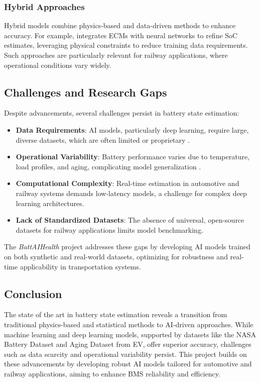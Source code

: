 \subsubsection{Hybrid Approaches}
Hybrid models combine physics-based and data-driven methods to enhance accuracy. For example, \cite{} integrates ECMs with neural networks to refine SoC estimates, leveraging physical constraints to reduce training data requirements. Such approaches are particularly relevant for railway applications, where operational conditions vary widely.


\subsection{Challenges and Research Gaps}
Despite advancements, several challenges persist in battery state estimation:
\begin{itemize}
    \item \textbf{Data Requirements}: AI models, particularly deep learning, require large, diverse datasets, which are often limited or proprietary .
    \item \textbf{Operational Variability}: Battery performance varies due to temperature, load profiles, and aging, complicating model generalization .
    \item \textbf{Computational Complexity}: Real-time estimation in automotive and railway systems demands low-latency models, a challenge for complex deep learning architectures.
    \item \textbf{Lack of Standardized Datasets}: The absence of universal, open-source datasets for railway applications limits model benchmarking.
\end{itemize}
The \textit{BattAIHealth} project addresses these gaps by developing AI models trained on both synthetic and real-world datasets, optimizing for robustness and real-time applicability in transportation systems.

\subsection{Conclusion}
The state of the art in battery state estimation reveals a transition from traditional physics-based and statistical methods to AI-driven approaches. While machine learning and deep learning models, supported by datasets like the NASA Battery Dataset and Aging Dataset from EV, offer superior accuracy, challenges such as data scarcity and operational variability persist. This project builds on these advancements by developing robust AI models tailored for automotive and railway applications, aiming to enhance BMS reliability and efficiency.